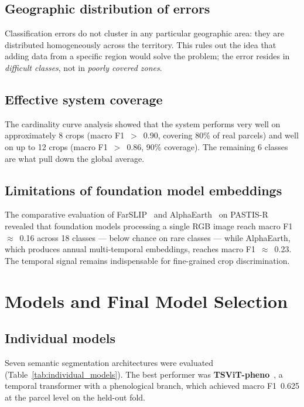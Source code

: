 \documentclass{article}
\begin{document}
\subsection{Geographic distribution of errors}
Classification errors do not cluster in any particular geographic area:
they are distributed homogeneously across the territory. This rules out
the idea that adding data from a specific region would solve the problem;
the error resides in \textit{difficult classes}, not in \textit{poorly
covered zones}.

\subsection{Effective system coverage}
The cardinality curve analysis showed that the system performs very well
on approximately 8 crops (macro F1~$>$~0.90, covering 80\% of real
parcels) and well on up to 12 crops (macro F1~$>$~0.86, 90\% coverage).
The remaining 6 classes are what pull down the global average.

\subsection{Limitations of foundation model embeddings}
The comparative evaluation of FarSLIP~\cite{li2025farslip} and
AlphaEarth~\cite{khanna2023alphaearth} on PASTIS-R revealed that
foundation models processing a single RGB image reach macro
F1~$\approx$~0.16 across 18 classes --- below chance on rare classes ---
while AlphaEarth, which produces annual multi-temporal embeddings, reaches
macro F1~$\approx$~0.23. The temporal signal remains indispensable for
fine-grained crop discrimination.

\section{Models and Final Model Selection}

\subsection{Individual models}

Seven semantic segmentation architectures were evaluated
(Table~\ref{tab:individual_models}). The best performer was
\textbf{TSViT-pheno}~\cite{nyborg2022tsvit}, a temporal transformer with
a phenological branch, which achieved macro F1~0.625 at the parcel level
on the held-out fold.
\end{document}
